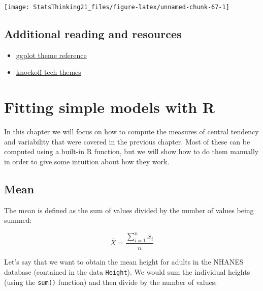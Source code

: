 \documentclass[12pt,]{book}
\newenvironment{Shaded}{\begin{snugshade}}{\end{snugshade}}
\newcommand{\KeywordTok}[1]{\textcolor[rgb]{0.13,0.29,0.53}{\textbf{#1}}}
\newcommand{\NormalTok}[1]{#1}
\newcommand{\OperatorTok}[1]{\textcolor[rgb]{0.81,0.36,0.00}{\textbf{#1}}}
\begin{document}
\texttt{[image: StatsThinking21\_files/figure-latex/unnamed-chunk-67-1]}

\hypertarget{additional-reading-and-resources}{%
\section{Additional reading and resources}\label{additional-reading-and-resources}}

\begin{itemize}
\item
  \href{http://ggplot2.tidyverse.org/reference/ggtheme.html}{ggplot theme reference}
\item
  \href{http://www.ggplot2-exts.org/ggtech.html}{knockoff tech themes}
\end{itemize}

\hypertarget{fitting-simple-models-with-r}{%
\chapter{Fitting simple models with R}\label{fitting-simple-models-with-r}}

In this chapter we will focus on how to compute the measures of central tendency and variability that were covered in the previous chapter. Most of these can be computed using a built-in R function, but we will show how to do them manually in order to give some intuition about how they work.

\hypertarget{mean}{%
\section{Mean}\label{mean}}

The mean is defined as the sum of values divided by the number of values being summed:

\[
\bar{X} = \frac{\sum_{i=1}^{n}x_i}{n}
\]

Let's say that we want to obtain the mean height for adults in the NHANES database (contained in the data \texttt{Height}). We would sum the individual heights (using the \texttt{sum()} function) and then divide by the number of values:

\begin{Shaded}
\end{Shaded}
\end{document}
